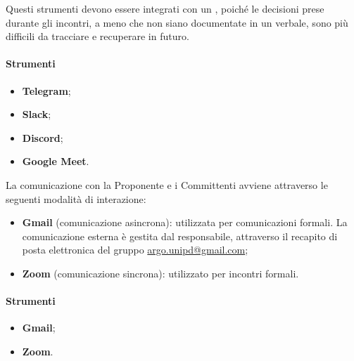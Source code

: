 \vspace{0.5\baselineskip}
\par Questi strumenti devono essere integrati con un , poiché le decisioni prese durante gli incontri, a meno che non siano documentate in un verbale, sono più difficili da tracciare e recuperare in futuro.

\paragraph*{Strumenti}
\begin{itemize}
  \item \textbf{Telegram};
  \item \textbf{Slack};
  \item \textbf{Discord};
  \item \textbf{Google Meet}.
\end{itemize}

\par La comunicazione con la Proponente e i Committenti avviene attraverso le seguenti modalità di interazione:
\begin{itemize}
  \item \textbf{Gmail} (comunicazione asincrona): utilizzata per comunicazioni formali. La comunicazione esterna è gestita dal responsabile, attraverso il recapito di posta elettronica del gruppo \href{mailto:argo.unipd@gmail.com}{argo.unipd\-@\-gmail.com};
  \item \textbf{Zoom} (comunicazione sincrona): utilizzato per incontri formali.
\end{itemize}

\paragraph*{Strumenti}
\begin{itemize}
  \item \textbf{Gmail};
  \item \textbf{Zoom}.
\end{itemize}